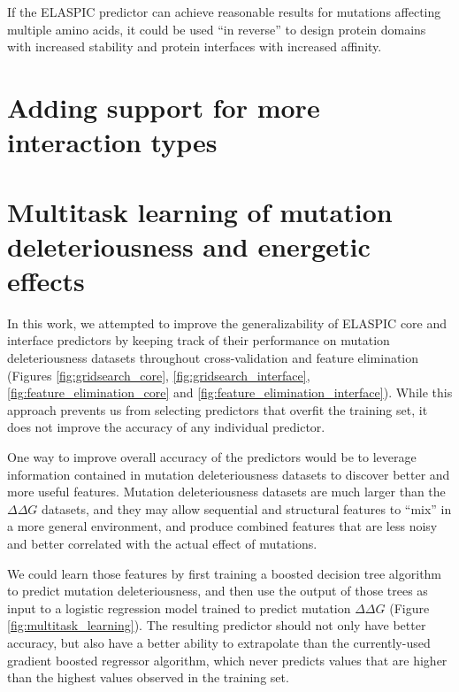 If the ELASPIC predictor can achieve reasonable results for mutations affecting multiple amino acids, it could be used ``in reverse'' to design protein domains with increased stability and protein interfaces with increased affinity.


\section{Adding support for more interaction types}




\section{Multitask learning of mutation deleteriousness and energetic effects}

In this work, we attempted to improve the generalizability of ELASPIC core and interface predictors by keeping track of their performance on mutation deleteriousness datasets throughout cross-validation and feature elimination (Figures \ref{fig:gridsearch_core}, \ref{fig:gridsearch_interface}, \ref{fig:feature_elimination_core} and \ref{fig:feature_elimination_interface}). While this approach prevents us from selecting predictors that overfit the training set, it does not improve the accuracy of any individual predictor.

One way to improve overall accuracy of the predictors would be to leverage information contained in mutation deleteriousness datasets to discover better and more useful features. Mutation deleteriousness datasets are much larger than the $\Delta \Delta G$ datasets, and they may allow sequential and structural features to ``mix'' in a more general environment, and produce combined features that are less noisy and better correlated with the actual effect of mutations.

We could learn those features by first training a boosted decision tree algorithm to predict mutation deleteriousness, and then use the output of those trees as input to a logistic regression model trained to predict mutation $\Delta \Delta G$ (Figure \ref{fig:multitask_learning}). The resulting predictor should not only have better accuracy, but also have a better ability to extrapolate than the currently-used gradient boosted regressor algorithm, which never predicts values that are higher than the highest values observed in the training set.

